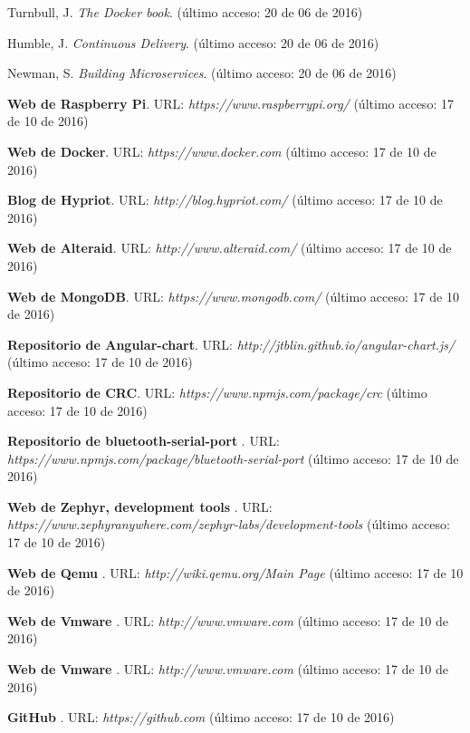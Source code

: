 \documentclass[spanish,final]{setup/eetac_tfc_pfc}
\begin{document}
\begin{thebibliography}{2}


Turnbull, J. {\it The Docker book}.
(último acceso: 20 de 06 de 2016)

Humble, J. {\it Continuous Delivery}.
(último acceso: 20 de 06 de 2016)

Newman, S. {\it Building Microservices}.
(último acceso: 20 de 06 de 2016)

{\bf Web de Raspberry Pi}. URL: {\it https://www.raspberrypi.org/}
(último acceso: 17 de 10 de 2016)

{\bf Web de Docker}. URL: {\it https://www.docker.com}
(último acceso: 17 de 10 de 2016)

{\bf Blog de Hypriot}.  URL: {\it http://blog.hypriot.com/}
(último acceso: 17 de 10 de 2016)

{\bf Web de Alteraid}.  URL: {\it http://www.alteraid.com/}
(último acceso: 17 de 10 de 2016)

{\bf Web de MongoDB}.  URL: {\it https://www.mongodb.com/}
(último acceso: 17 de 10 de 2016)

{\bf Repositorio de Angular-chart}.  URL: {\it http://jtblin.github.io/angular-chart.js/}
(último acceso: 17 de 10 de 2016)

{\bf Repositorio de CRC}.  URL: {\it https://www.npmjs.com/package/crc}
(último acceso: 17 de 10 de 2016)

{\bf Repositorio de bluetooth-serial-port }.  URL: {\it https://www.npmjs.com/package/bluetooth-serial-port}
(último acceso: 17 de 10 de 2016)

{\bf Web de Zephyr, development tools }.  URL: {\it https://www.zephyranywhere.com/zephyr-labs/development-tools}
(último acceso: 17 de 10 de 2016)

{\bf Web de Qemu }.  URL: {\it http://wiki.qemu.org/Main Page}
(último acceso: 17 de 10 de 2016)

{\bf Web de Vmware }.  URL: {\it http://www.vmware.com}
(último acceso: 17 de 10 de 2016)

{\bf Web de Vmware }.  URL: {\it http://www.vmware.com}
(último acceso: 17 de 10 de 2016)

{\bf GitHub }.  URL: {\it https://github.com}
(último acceso: 17 de 10 de 2016)



\end{thebibliography}
\end{document}
